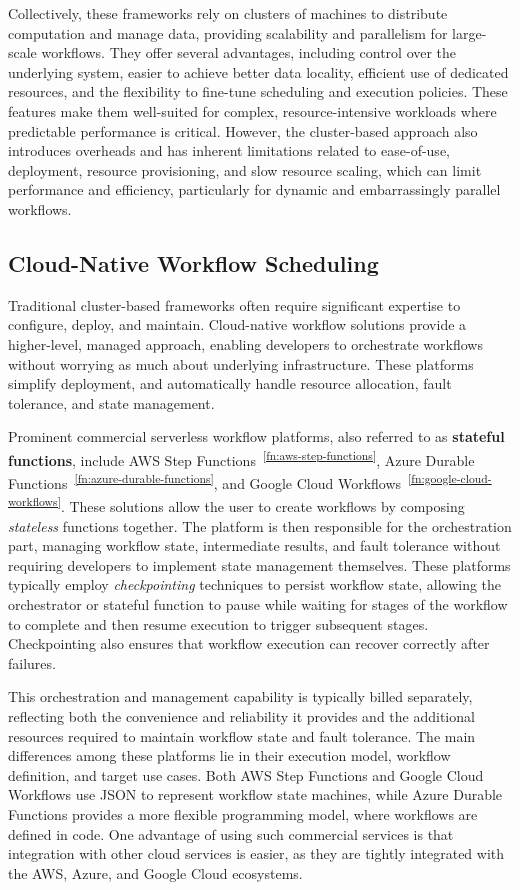 \documentclass[conference]{IEEEtran}
\begin{document}
Collectively, these frameworks rely on clusters of machines to distribute computation and manage data, providing scalability and parallelism for large-scale workflows. They offer several advantages, including control over the underlying system, easier to achieve better data locality, efficient use of dedicated resources, and the flexibility to fine-tune scheduling and execution policies. These features make them well-suited for complex, resource-intensive workloads where predictable performance is critical. However, the cluster-based approach also introduces overheads and has inherent limitations related to ease-of-use, deployment, resource provisioning, and slow resource scaling, which can limit performance and efficiency, particularly for dynamic and embarrassingly parallel workflows.

\subsection{Cloud-Native Workflow Scheduling}
Traditional cluster-based frameworks often require significant expertise to configure, deploy, and maintain. Cloud-native workflow solutions provide a higher-level, managed approach, enabling developers to orchestrate workflows without worrying as much about underlying infrastructure. These platforms simplify deployment, and automatically handle resource allocation, fault tolerance, and state management.

Prominent commercial serverless workflow platforms, also referred to as \textbf{stateful functions}, include AWS Step Functions~\textsuperscript{\ref{fn:aws-step-functions}}, Azure Durable Functions~\textsuperscript{\ref{fn:azure-durable-functions}}, and Google Cloud Workflows~\textsuperscript{\ref{fn:google-cloud-workflows}}. These solutions allow the user to create workflows by composing \textit{stateless} functions together. The platform is then responsible for the orchestration part, managing workflow state, intermediate results, and fault tolerance without requiring developers to implement state management themselves. These platforms typically employ \textit{checkpointing} techniques to persist workflow state, allowing the orchestrator or stateful function to pause while waiting for stages of the workflow to complete and then resume execution to trigger subsequent stages. Checkpointing also ensures that workflow execution can recover correctly after failures.

This orchestration and management capability is typically billed separately, reflecting both the convenience and reliability it provides and the additional resources required to maintain workflow state and fault tolerance. The main differences among these platforms lie in their execution model, workflow definition, and target use cases. Both AWS Step Functions and Google Cloud Workflows use JSON to represent workflow state machines, while Azure Durable Functions provides a more flexible programming model, where workflows are defined in code. One advantage of using such commercial services is that integration with other cloud services is easier, as they are tightly integrated with the AWS, Azure, and Google Cloud ecosystems.
\end{document}
